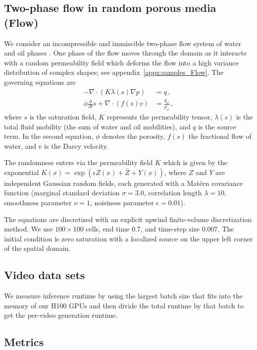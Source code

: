 \documentclass{article}
\theoremstyle{plain}
\theoremstyle{definition}
\theoremstyle{remark}
\begin{document}
\subsection{Two-phase flow in random porous media (Flow)}
\label{appx:flow}

We consider an incompressible and immiscible two-phase flow system of water and oil phases \cite{Aarnes2007}. One phase of the flow moves through the domain as it interacts with a random permeability field which deforms the flow into a high variance distribution of complex shapes; see appendix~\ref{appx:samples_Flow}. The governing equations are
\begin{align*}
  - \nabla \cdot (K \lambda (s) \nabla p)                  & = q\,,                                \\
  \phi\frac{\partial}{\partial t}s + \nabla \cdot (f(s) v) & = \frac{q_{\omega}}{\rho_{\omega}}\,,
\end{align*}
where $s$ is the saturation field, $K$ represents the permeability tensor, $\lambda(s)$ is the total fluid mobility (the sum of water and oil mobilities), and $q$ is the source term. In the second equation, $\phi$ denotes the porosity, $f(s)$ the fractional flow of water, and $v$ is the Darcy velocity.

The randomness enters via the permeability field $K$ which is given by the exponential $K(x) = \operatorname{exp}(\epsilon Z(x) + \bar{Z} + Y(x))$, where $Z$ and $Y$ are independent Gaussian random fields, each generated with a Mat\'ern covariance function (marginal standard deviation $\sigma = 3.0$, correlation length $\lambda = 10$, smoothness parameter $\nu = 1$, noisiness parameter $\epsilon = 0.01$).

The equations are discretized with an explicit upwind finite-volume discretization method. We use $100 \times 100$ cells, end time $0.7$, and time-step size $0.007$. The initial condition is zero saturation with a localized source on the upper left corner of the spatial domain.

\subsection{Video data sets}

We measure inference runtime by using the largest batch size that fits into the memory of our H100 GPUs and then divide the total runtime by that batch to get the per-video generation runtime.

\subsection{Metrics}
\label{appx:metrics}
\end{document}

